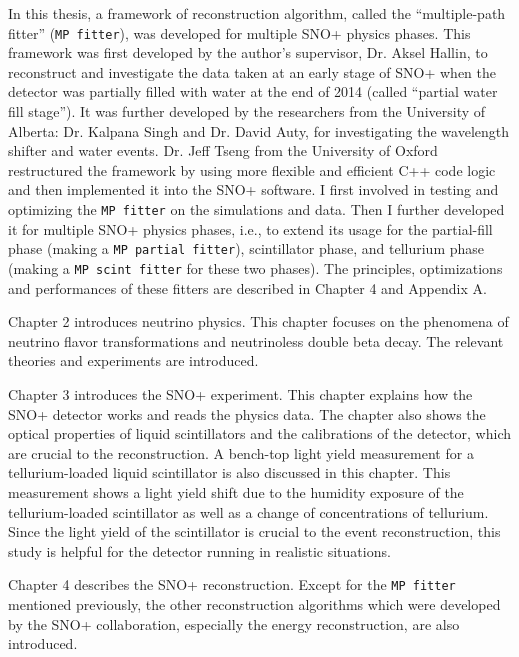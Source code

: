 In this thesis, a framework of reconstruction algorithm, called the ``multiple-path fitter'' (\texttt{MP fitter}), was developed for multiple SNO+ physics phases. This framework was first developed by the author's supervisor, Dr. Aksel Hallin, to reconstruct and investigate the data taken at an early stage of SNO+ when the detector was partially filled with water at the end of 2014 (called ``partial water fill stage'')\cite{partialWater}. It was further developed by the researchers from the University of Alberta: Dr. Kalpana Singh and Dr. David Auty, for investigating the wavelength shifter and water events\cite{davidPartialWater, kalpanaWLS, kalpanaWLS2, kalpanaMPFitter}. Dr. Jeff Tseng from the University of Oxford restructured the framework by using more flexible and efficient C++ code logic and then implemented it into the SNO+ software\cite{jieMPW}. I first involved in testing and optimizing the \texttt{MP fitter} on the simulations and data. Then I further developed it for multiple SNO+ physics phases, i.e., to extend its usage for the partial-fill phase (making a \texttt{MP partial fitter}), scintillator phase, and tellurium phase (making a \texttt{MP scint fitter} for these two phases). The principles, optimizations and performances of these fitters are described in Chapter 4 and Appendix A.

Chapter 2 introduces neutrino physics. This chapter focuses on the phenomena of neutrino flavor transformations and neutrinoless double beta decay. The relevant theories and experiments are introduced.

Chapter 3 introduces the SNO+ experiment. This chapter explains how the SNO+ detector works and reads the physics data. The chapter also shows the optical properties of liquid scintillators and the calibrations of the detector, which are crucial to the reconstruction. A bench-top light yield measurement for a tellurium-loaded liquid scintillator is also discussed in this chapter. This measurement shows a light yield shift due to the humidity exposure of the tellurium-loaded scintillator as well as a change of concentrations of tellurium. Since the light yield of the scintillator is crucial to the event reconstruction, this study is helpful for the detector running in realistic situations.

Chapter 4 describes the SNO+ reconstruction. Except for the \texttt{MP fitter} mentioned previously, the other reconstruction algorithms which were developed by the SNO+ collaboration, especially the energy reconstruction, are also introduced. 

